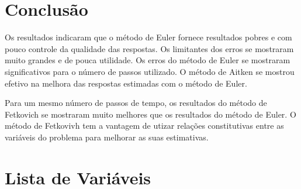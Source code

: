 \documentclass[final,5p]{elsarticle}
\numberwithin{equation}{section}
\begin{document}
    \section{Conclusão}

        Os resultados indicaram que o método de Euler fornece resultados pobres e com pouco controle da qualidade das respostas. Os limitantes dos erros se mostraram muito grandes e de pouca utilidade. Os erros do método de Euler se mostraram significativos para o número de passos utilizado. O método de Aitken se mostrou efetivo na melhora das respostas estimadas com o método de Euler.

        Para um mesmo número de passos de tempo, os resultados do método de Fetkovich se mostraram muito melhores que os resultados do método de Euler. O método de Fetkovivh tem a vantagem de utizar relações constitutivas entre as variáveis do problema para melhorar as suas estimativas.



\appendix

\section{Lista de Variáveis}
\end{document}
